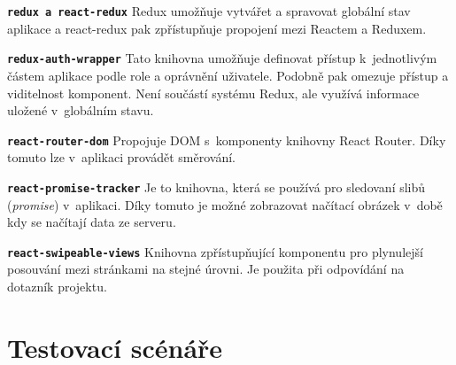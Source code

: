 \begin{DESCRIPTION}
\item \texttt{\textbf{redux a react-redux}} Redux umožňuje vytvářet a spravovat globální stav aplikace a react-redux pak zpřístupňuje propojení mezi Reactem a Reduxem. 
\item \texttt{\textbf{redux-auth-wrapper}} Tato knihovna umožňuje definovat přístup k~jednotlivým částem aplikace podle role a oprávnění uživatele. Podobně pak omezuje přístup a viditelnost komponent. Není součástí systému Redux, ale využívá informace uložené v~globálním stavu. 
\item \texttt{\textbf{react-router-dom}} Propojuje DOM s~komponenty knihovny React Router. Díky tomuto lze v~aplikaci provádět směrování. 
\item \texttt{\textbf{react-promise-tracker}} Je to knihovna, která se používá pro sledovaní slibů (\textit{promise}) v~aplikaci. Díky tomuto je možné zobrazovat načítací obrázek v~době kdy se načítají data ze serveru.
\item \texttt{\textbf{react-swipeable-views}} Knihovna zpřístupňující komponentu pro plynulejší posouvání mezi stránkami na stejné úrovni. Je použita při odpovídání na dotazník projektu.
\end{DESCRIPTION}

\chapter{Testovací scénáře}